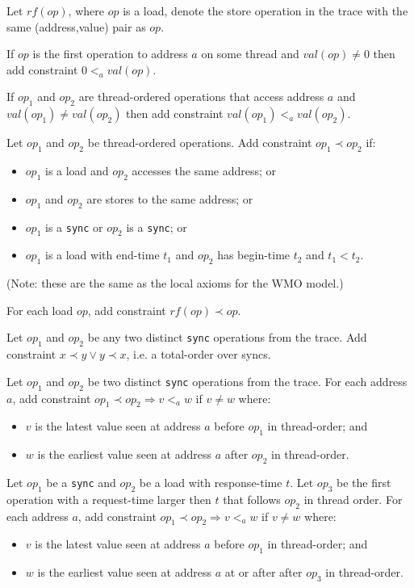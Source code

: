 \documentclass[11pt]{article}
\begin{document}
\noindent Let $rf(op)$, where $op$ is a load, denote the store
operation in the trace with the same (address,value) pair as $op$.

\noindent If $op$ is the first operation to address $a$ on some thread and
$val(op) \neq 0$ then add constraint $0 <_a val(op)$.

\noindent If $op_1$ and $op_2$ are thread-ordered operations that
access address $a$ and $val(op_1) \neq val(op_2)$ then add constraint
$val(op_1) <_a val(op_2)$.

\noindent Let $op_1$ and $op_2$ be thread-ordered operations.
Add constraint $op_1 \prec op_2$ if:

\begin{itemize}

\item $op_1$ is a load and $op_2$ accesses the same address; or

\item $op_1$ and $op_2$ are stores to the same address; or

\item $op_1$ is a \verb!sync! or $op_2$ is a \verb!sync!; or

\item $op_1$ is a load with end-time $t_1$ and $op_2$ has begin-time
$t_2$ and $t_1 < t_2$.

\end{itemize}

\noindent (Note: these are the same as the local axioms for the WMO
model.)

\noindent For each load $op$, add constraint $rf(op) \prec op$.

\noindent Let $op_1$ and $op_2$ be any two distinct \verb!sync!
operations from the trace.  Add constraint
$x \prec y \vee y \prec x$, i.e. a total-order over syncs.

\noindent Let $op_1$ and $op_2$ be two distinct \verb!sync! operations
from the trace. For each address $a$, add constraint
$op_1 \prec op_2 \Rightarrow v <_a w$ if $v \neq w$ where:
\begin{itemize}
\item
  $v$ is the latest value seen at address $a$ before $op_1$
      in thread-order; and
\item
  $w$ is the earliest value seen at
      address $a$ after $op_2$ in thread-order.
\end{itemize}

\noindent Let $op_1$ be a \verb!sync! and $op_2$ be a load with
response-time $t$. Let $op_3$ be the first operation with a
request-time larger then $t$ that follows $op_2$ in thread order.
For each address $a$, add constraint $op_1 \prec op_2 \Rightarrow v <_a
w$ if $v \neq w$ where:
\begin{itemize}
\item
  $v$ is the latest value seen at address $a$ before $op_1$
      in thread-order; and
\item
  $w$ is the earliest value seen at
      address $a$ at or after after $op_3$ in thread-order.
\end{itemize}
\end{document}
